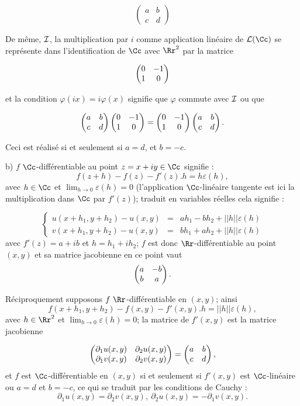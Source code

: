 {\begin{enumerate}
{$$\begin{pmatrix}a&b\\ c&d \end{pmatrix}$$

De même, $\cal I$, la multiplication par $i$ comme application linéaire de 
${\cal L}(\Cc)$ se représente dans l'identification de $\Cc$ avec $\Rr^2$
par la matrice

$$\begin{pmatrix}0&-1\cr 1&0 \cr \end{pmatrix}$$

et la condition  $\varphi(ix)=i\varphi(x)$ signifie que $\varphi$ commute
avec $\cal I$ ou que 

$$\begin{pmatrix}a&b\cr c&d \cr\end{pmatrix}
\begin{pmatrix}0&-1\cr 1&0 \cr \end{pmatrix}=
\begin{pmatrix}0&-1\cr 1&0 \cr\end{pmatrix}
\begin{pmatrix}a&b\cr c&d \cr \end{pmatrix}.$$

Ceci est réalisé si et seulement si $a=d$, et $b=-c$.

\smallskip

b) $f$ $\Cc$-différentiable au point $z=x+iy\in \Cc$ signifie : 
$$f(z+h)-f(z)-f'(z).h=h\varepsilon(h),$$ avec $h\in\Cc$ et $\lim_{h\to
0}\varepsilon(h)=0$ (l'application 
$\Cc$-linéaire tangente est ici la multiplication dans $\Cc$ par $f'(z)$);
traduit en variables réelles cela signifie :

$$\left \{
\begin{array}{ccc} 
u(x+h_1,y+h_2)-u(x,y)&=&ah_1-bh_2+ ||h||
\varepsilon(h)\\
v(x+h_1,y+h_2)-u(x,y)&=&bh_1+ah_2+ ||h||
\varepsilon(h)
\end{array}\right.$$
avec $f'(z)=a+ib$ et $h=h_1+ih_2$; 
$f$ est donc $\Rr$-différentiable au point $(x,y)$  et sa
matrice jacobienne en ce point vaut 
$$\begin{pmatrix}a&-b\cr b&a \cr \end{pmatrix}.$$

Réciproquement supposons $f\  \Rr$-différentiable
en $(x,y)$; ainsi
$$f(x+h_1,y+h_2)-f(x,y)-f'(x,y).h=||h||
\varepsilon(h),$$
avec
$h\in\Rr^2$ et $\lim_{h\to
0}\varepsilon(h)=0$; la matrice de $f'(x,y)$ est la matrice jacobienne 

$$\begin{pmatrix}\partial_1u(x,y)&\partial_2u(x,y)\cr \partial_1v(x,y)&
\partial_2v(x,y) \cr \end{pmatrix}=\begin{pmatrix}a&b\cr c&d \cr \end{pmatrix},$$ et $f$ est  
$\Cc$-différentiable en
$(x,y)$ 
si et seulement si $f'(x,y)$ est $\Cc$-linéaire ou  $a=d$ et $b=-c$, ce qui se
traduit par les conditions de Cauchy : 
$$\partial_1u(x,y)=\partial_2v(x,y),\ \partial_2u(x,y)=-\partial_1v(x,y).$$

}
\end{enumerate}}
